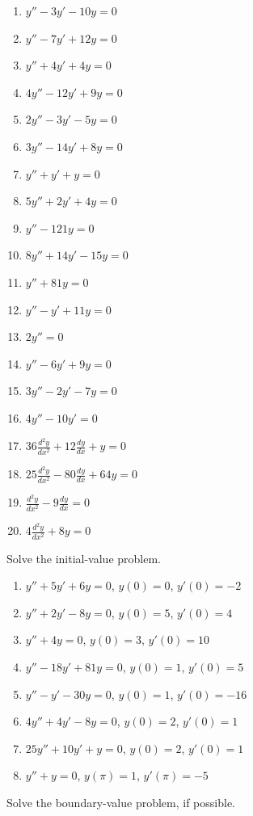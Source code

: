 \documentclass{exercises}
\begin{document}
\begin{enumerate}[resume]
\item $y''-3y'-10y=0$
\item $y''-7y'+12y=0$
\item $y''+4y'+4y=0$
\item $4y''-12y'+9y=0$
\item $2y''-3y'-5y=0$
\item $3y''-14y'+8y=0$
\item $y''+y'+y=0$
\item $5y''+2y'+4y=0$
\item $y''-121y=0$
\item $8y''+14y'-15y=0$
\item $y''+81y=0$
\item $y''-y'+11y=0$
\item $2y''=0$
\item $y''-6y'+9y=0$
\item $3y''-2y'-7y=0$
\item $4y''-10y'=0$
\item $36\frac{d^{2}y}{dx^{2}}+12\frac{dy}{dx}+y=0$
\item $25\frac{d^{2}y}{dx^{2}}-80\frac{dy}{dx}+64y=0$
\item $\frac{d^{2}y}{dx^{2}}-9\frac{dy}{dx}=0$
\item $4\frac{d^{2}y}{dx^{2}}+8y=0$
\end{enumerate}

Solve the initial-value problem.

\begin{enumerate}[resume]
\item $y''+5y'+6y=0$, $y(0)=0$, $y'(0)=-2$
\item $y''+2y'-8y=0$, $y(0)=5$, $y'(0)=4$
\item $y''+4y=0$, $y(0)=3$, $y'(0)=10$
\item $y''-18y'+81y=0$, $y(0)=1$, $y'(0)=5$
\item $y''-y'-30y=0$, $y(0)=1$, $y'(0)=-16$
\item $4y''+4y'-8y=0$, $y(0)=2$, $y'(0)=1$
\item $25y''+10y'+y=0$, $y(0)=2$, $y'(0)=1$
\item $y''+y=0$, $y(\pi)=1$, $y'(\pi)=-5$
\end{enumerate}

Solve the boundary-value problem, if possible.
\end{document}
